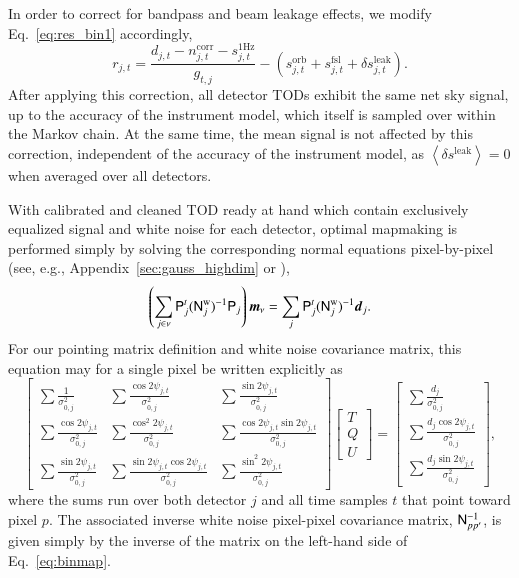\documentclass[onecolumn]{aa}
\renewcommand{\d}[0]{\vec{d}}
\newcommand{\m}[0]{\vec{m}}
\newcommand{\N}[0]{\tens{N}}
\renewcommand{\P}[0]{\tens{P}}
\begin{document}
In order to correct for bandpass and beam leakage effects, we modify
Eq.~\eqref{eq:res_bin1} accordingly,
\begin{equation}
  r_{j,t} = \frac{d_{j,t}- n^{\mathrm{corr}}_{j,t} - s^{\mathrm{1Hz}}_{j,t}}{g_{t,j}} - \left(s^{\mathrm{orb}}_{j,t}  
  + s^{\mathrm{fsl}}_{j,t} + \delta s^{\mathrm{leak}}_{j, t}\right).
\end{equation}
After applying this correction, all detector TODs exhibit the same net
sky signal, up to the accuracy of the instrument model, which itself
is sampled over within the Markov chain. At the same time, the mean
signal is not affected by this correction, independent of the accuracy
of the instrument model, as ${\left<\delta s^{\mathrm{leak}}\right> =
0}$ when averaged over all detectors.

With calibrated and cleaned TOD ready at hand which contain
exclusively equalized signal and white noise for each detector,
optimal mapmaking is performed simply by solving the corresponding
normal equations pixel-by-pixel (see, e.g.,
Appendix~\ref{sec:gauss_highdim} or \citealp{ashdown:2007}),
\begin{equation}
\left(\sum_{j \in \nu} \P_j^t (\N^{\mathrm{w}}_{j})^{-1} \P_j\right) \m_{\nu} =
\sum_j \P_j^t (\N^{\mathrm{w}}_j)^{-1}\d_j.
\label{eq:binmap}
\end{equation}
For our pointing matrix definition and white noise covariance matrix,
this equation may for a single pixel be written explicitly as
{\scriptsize
\begin{equation}
  \left[\begin{array}{ccc}
      \sum \frac{1}{\sigma_{0,j}^2} & \sum \frac{\cos
        2\psi_{j,t}}{\sigma_{0,j}^2} & \sum \frac{\sin
        2\psi_{j,t}}{\sigma_{0,j}^2} \\
            \sum \frac{\cos 2\psi_{j,t}}{\sigma_{0,j}^2} & \sum \frac{\cos^2
        2\psi_{j,t}}{\sigma_{0,j}^2} & \sum \frac{\cos 2\psi_{j,t} \sin
              2\psi_{j,t}}{\sigma_{0,j}^2} \\
                  \sum \frac{\sin 2\psi_{j,t}}{\sigma_{0,j}^2} & \sum
                  \frac{\sin 2\psi_{j,t} \cos
        2\psi_{j,t}}{\sigma_{0,j}^2} & \sum \frac{\sin^2
        2\psi_{j,t}}{\sigma_{0,j}^2}
    \end{array}\right]
  \left[\begin{array}{c}
      T \\ Q \\ U
    \end{array}\right]
  =
  \left[\begin{array}{c}
      \sum \frac{d_j}{\sigma_{0,j}^2} \\ \sum \frac{d_j\cos
        2\psi_{j,t}}{\sigma_{0,j}^2} \\ \sum \frac{d_j\sin
        2\psi_{j,t}}{\sigma_{0,j}^2}
    \end{array}\right],
  \label{eq:binmap2}
\end{equation}}
where the sums run over both detector $j$ and all time samples $t$ that
point toward pixel $p$. The associated inverse white noise pixel-pixel
covariance matrix, $\N^{-1}_{pp'}$, is given simply by the inverse
of the matrix on the left-hand side of Eq.~\eqref{eq:binmap}.
\end{document}
